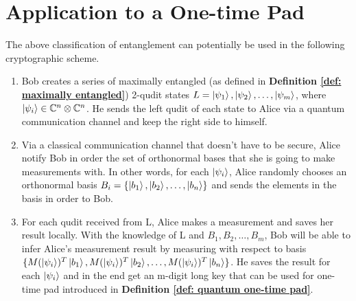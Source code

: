 \section{Application to a One-time Pad}
The above classification of entanglement can potentially be used in the following cryptographic scheme.
\begin{enumerate}
    \item Bob creates a series of maximally entangled (as defined in \textbf{Definition \ref{def: maximally entangled}}) 2-qudit states $L={\ket{\psi_1}, \ket{\psi_2}, \hdots, \ket{\psi_m}}$, where $\ket{\psi_i} \in \mathbb{C}^n \otimes \mathbb{C}^n$. He sends the left qudit of each state to Alice via a quantum communication channel and keep the right side to himself.
    \item Via a classical communication channel that doesn't have to be secure, Alice notify Bob in order the set of orthonormal bases that she is going to make measurements with. In other words, for each $\ket{\psi_i}$, Alice randomly chooses an orthonormal basis $B_i=\{\ket{b_1}, \ket{b_2}, \hdots, \ket{b_n}\}$ and sends the elements in the basis in order to Bob.
    \item For each qudit received from L, Alice makes a measurement and saves her result locally. With the knowledge of L and $B_1, B_2, \hdots, B_m$, Bob will be able to infer Alice's measurement result by measuring with respect to basis $\{M(\ket{\psi_i})^T \ket{b_1}, M(\ket{\psi_i})^T \ket{b_2}, \hdots, M(\ket{\psi_i})^T \ket{b_n}\}$. He saves the result for each $\ket{\psi_i}$ and in the end get an m-digit long key that can be used for one-time pad introduced in \textbf{Definition \ref{def: quantum one-time pad}}.
\end{enumerate}